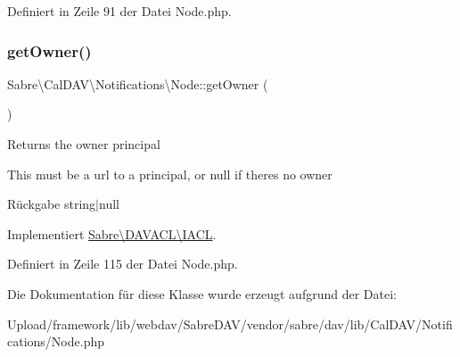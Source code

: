 Definiert in Zeile 91 der Datei Node.\+php.

\mbox{\label{class_sabre_1_1_cal_d_a_v_1_1_notifications_1_1_node_a0810acd54778a3067fdae01d77bc8b77}} 
\subsubsection{\texorpdfstring{get\+Owner()}{getOwner()}}
{\footnotesize\ttfamily Sabre\textbackslash{}\+Cal\+D\+A\+V\textbackslash{}\+Notifications\textbackslash{}\+Node\+::get\+Owner (\begin{DoxyParamCaption}{ }\end{DoxyParamCaption})}

Returns the owner principal

This must be a url to a principal, or null if there\textquotesingle{}s no owner

\begin{DoxyReturn}{Rückgabe}
string$\vert$null 
\end{DoxyReturn}


Implementiert \mbox{\hyperlink{interface_sabre_1_1_d_a_v_a_c_l_1_1_i_a_c_l_a05f531b4ae1a86eab4e6e95b0413390e}{Sabre\textbackslash{}\+D\+A\+V\+A\+C\+L\textbackslash{}\+I\+A\+CL}}.



Definiert in Zeile 115 der Datei Node.\+php.



Die Dokumentation für diese Klasse wurde erzeugt aufgrund der Datei\+:\begin{DoxyCompactItemize}
\item 
Upload/framework/lib/webdav/\+Sabre\+D\+A\+V/vendor/sabre/dav/lib/\+Cal\+D\+A\+V/\+Notifications/Node.\+php\end{DoxyCompactItemize}

